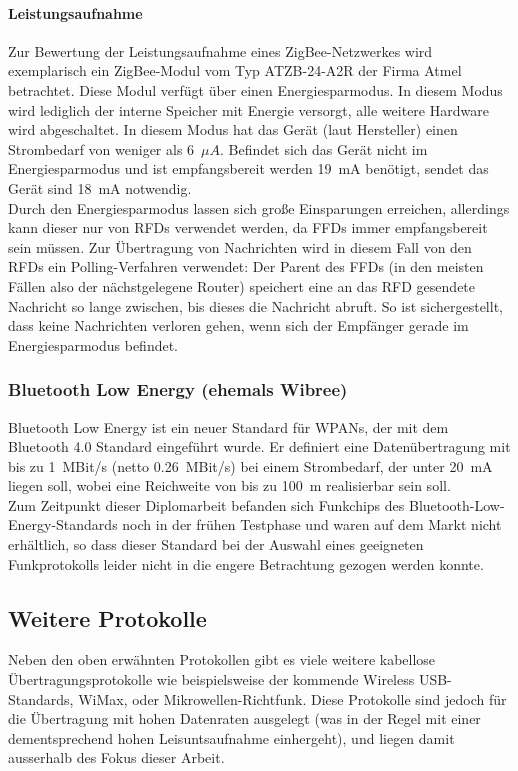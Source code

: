             \paragraph{Leistungsaufnahme}
                Zur Bewertung der Leistungsaufnahme eines ZigBee-Netzwerkes wird exemplarisch ein ZigBee-Modul
                vom Typ ATZB-24-A2R der Firma Atmel betrachtet. Diese Modul verfügt über einen Energiesparmodus.
                In diesem Modus wird lediglich der interne Speicher mit Energie versorgt, alle weitere Hardware
                wird abgeschaltet. In diesem Modus hat das Gerät (laut Hersteller) einen Strombedarf von weniger als
                6~$\mu{}A$. Befindet sich das Gerät nicht im Energiesparmodus und ist empfangsbereit werden 19~mA
                benötigt, sendet das Gerät sind 18~mA notwendig.\\
                Durch den Energiesparmodus lassen sich große Einsparungen erreichen, allerdings kann dieser nur von 
                RFDs verwendet werden, da FFDs immer empfangsbereit sein müssen. Zur Übertragung von Nachrichten
                wird in diesem Fall von den RFDs ein Polling-Verfahren verwendet: Der Parent des FFDs (in den meisten
                Fällen also der nächstgelegene Router) speichert eine an das RFD gesendete Nachricht so lange zwischen,
                bis dieses die Nachricht abruft. So ist sichergestellt, dass keine Nachrichten verloren gehen, wenn
                sich der Empfänger gerade im Energiesparmodus befindet.
           

        \subsubsection{Bluetooth Low Energy (ehemals Wibree)}\label{wibree}
            Bluetooth Low Energy ist ein neuer Standard für WPANs, der mit dem Bluetooth 4.0 Standard eingeführt
            wurde. Er definiert eine Datenübertragung mit bis zu 1~MBit/s (netto 0.26~MBit/s) bei einem Strombedarf,
            der unter 20~mA liegen soll, wobei eine Reichweite von bis zu 100~m realisierbar sein soll.\\
            Zum Zeitpunkt dieser Diplomarbeit befanden sich Funkchips des Bluetooth-Low-Energy-Standards noch in 
            der frühen Testphase und waren auf dem Markt nicht erhältlich, so dass dieser Standard bei der Auswahl
            eines geeigneten Funkprotokolls leider nicht in die engere Betrachtung gezogen werden konnte.
            

    \subsection{Weitere Protokolle}
        Neben den oben erwähnten Protokollen gibt es viele weitere kabellose Übertragungsprotokolle wie beispielsweise 
        der kommende Wireless USB-Standards, WiMax, oder Mikrowellen-Richtfunk. Diese Protokolle sind jedoch für die
        Übertragung mit hohen Datenraten ausgelegt (was in der Regel mit einer dementsprechend hohen Leisuntsaufnahme
        einhergeht), und liegen damit ausserhalb des Fokus dieser Arbeit.



